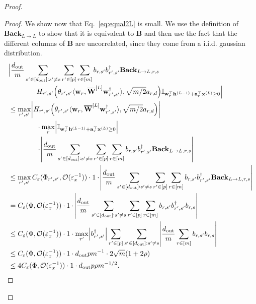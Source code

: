 \begin{claim}
\begin{proof}
\begin{proof}
					We show now that Eq.~\ref{eq:equal2L}  is small. We use the definition of $\mathbf{Back}_{L \to L}$ to show that it is equivalent to $\mathbf{B}$ and then use the fact that the different columns of $\mathbf{B}$ are uncorrelated, since they come from a i.i.d. gaussian distribution.
					\begingroup
					\allowdisplaybreaks
					\begin{align*}
						&\Big|\frac{\dout }{m}   \sum_{s' \in [\dout ]: s' \ne s} \sum_{r' \in [p]} \sum_{r \in [m]}  b_{r, s'} b_{r', s'}^{\dagger} \mathbf{Back}_{L \to L, r, s} \\& \quad \quad \quad \quad H_{r', s'}\Big(\theta_{r', s'} \langle \mathbf{w}_{r}, \overline{\mathbf{W}}^{[L]} \mathbf{w}_{r', s'}^{\dagger}\rangle , \sqrt{m/2} a_{r, d}\Big) \mathbb{I}_{\mathbf{w}_r^{\top} \mathbf{h}^{(L-1)} + \mathbf{a}_r^{\top} \mathbf{x}^{(L)} \ge 0}\Big|
						\\& \le \max_{r', s'} \abs{H_{r', s'}\Big(\theta_{r', s'} \langle \mathbf{w}_{r}, \overline{\mathbf{W}}^{[L]} \mathbf{w}_{r', s'}^{\dagger}\rangle , \sqrt{m/2} a_{r, d}\Big)} \\& \quad \quad \quad \quad 
						\cdot \max_r \abs{\mathbb{I}_{\mathbf{w}_r^{\top} \mathbf{h}^{(L-1)} + \mathbf{a}_r^{\top} \mathbf{x}^{(L)} \ge 0}}
						\\& \quad \quad \quad \quad \cdot \abs{\frac{\dout }{m}   \sum_{s' \in [\dout ]: s' \ne s} \sum_{r' \in [p]} \sum_{r \in [m]}  b_{r, s'} b_{r', s'}^{\dagger} \mathbf{Back}_{L \to L, r, s}}
						\\&\le \max_{r',s'} C_\varepsilon(\Phi_{r', s'}, \mathcal{O}( \varepsilon_x^{-1})) \cdot 1 \cdot \abs{\frac{\dout }{m}   \sum_{s' \in [\dout ]: s' \ne s} \sum_{r' \in [p]} \sum_{r \in [m]}  b_{r, s'} b_{r', s'}^{\dagger} \mathbf{Back}_{L \to L, r, s}} \\ &=
						C_\varepsilon(\Phi, \mathcal{O}( \varepsilon_x^{-1})) \cdot 1 \cdot \abs{\frac{\dout }{m}   \sum_{s' \in [\dout ]: s' \ne s} \sum_{r' \in [p]} \sum_{r \in [m]}  b_{r, s'} b_{r', s'}^{\dagger} b_{r, s}} \\&\le C_\varepsilon(\Phi, \mathcal{O}( \varepsilon_x^{-1})) \cdot 1 \cdot \max_{r'} \abs{b_{r', s'}^{\dagger}} \sum_{r' \in [p]} \sum_{s' \in [\dout ]: s' \ne s}  \abs{\frac{\dout }{m}    \sum_{r \in [m]}  b_{r, s'}  b_{r, s}} \\&
						\le C_\varepsilon(\Phi, \mathcal{O}( \varepsilon_x^{-1})) \cdot 1 \cdot \dout p m^{-1} \cdot 2\sqrt{m} (1 + 2\rho) \\&
						\le 4 C_\varepsilon(\Phi, \mathcal{O}( \varepsilon_x^{-1})) \cdot 1 \cdot \dout p \rho m^{-1/2}.

\end{align*}
\end{proof}
\end{proof}
\end{claim}
